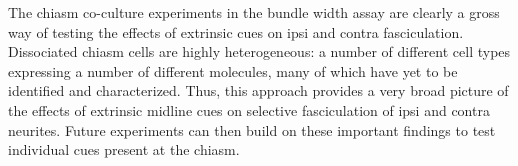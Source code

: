 The chiasm co-culture experiments in the bundle width assay are clearly a gross way of testing the effects of extrinsic cues on ipsi and contra fasciculation.
Dissociated chiasm cells are highly heterogeneous: a number of different cell types expressing a number of different molecules, many of which have yet to be identified and characterized.
Thus, this approach provides a very broad picture of the effects of extrinsic midline cues on selective fasciculation of ipsi and contra neurites.
Future experiments can then build on these important findings to test individual cues present at the chiasm.